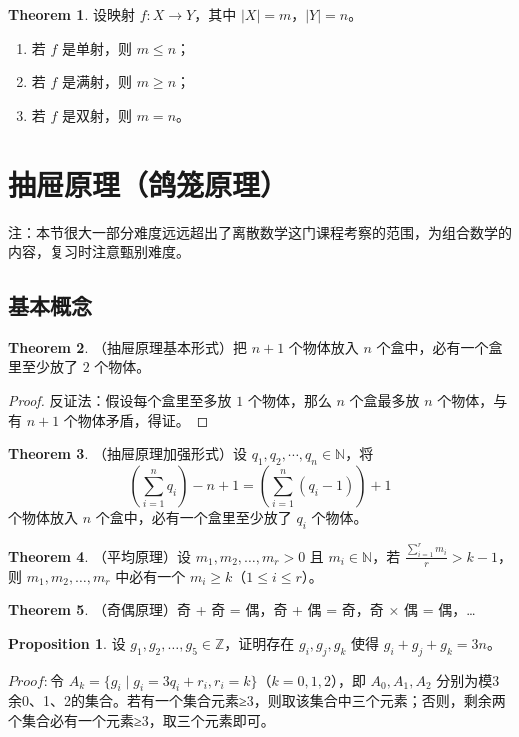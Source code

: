 \documentclass[oneside]{book}
\theoremstyle{definition}
\newtheorem{proposition}{Proposition}[section]
\newtheorem{theorem}{Theorem}[section]
\begin{document}
	
	\begin{theorem}
		设映射 \( f: X \to Y \)，其中 \( |X| = m \)，\( |Y| = n \)。
		\begin{enumerate}
			\item 若 \( f \) 是单射，则 \( m \leq n \)；
			\item 若 \( f \) 是满射，则 \( m \geq n \)；
			\item 若 \( f \) 是双射，则 \( m = n \)。
		\end{enumerate}
	\end{theorem}
	
	\section{抽屉原理（鸽笼原理）}
	注：本节很大一部分难度远远超出了离散数学这门课程考察的范围，为组合数学的内容，复习时注意甄别难度。
	\subsection{基本概念}
	\begin{theorem}
		（抽屉原理基本形式）把 \( n + 1 \) 个物体放入 \( n \) 个盒中，必有一个盒里至少放了 \( 2 \) 个物体。
		\begin{proof}
			反证法：假设每个盒里至多放 \( 1 \) 个物体，那么 \( n \) 个盒最多放 \( n \) 个物体，与有 \( n + 1 \) 个物体矛盾，得证。
		\end{proof}
	\end{theorem}
	
	\begin{theorem}
		（抽屉原理加强形式）设 \( q_1,q_2,\cdots,q_n \in \mathbb{N} \)，将 
		$$ \left( \sum_{i = 1}^n q_i \right) - n + 1 = \left( \sum_{i = 1}^n (q_i-1) \right)  + 1$$
		个物体放入 \( n \) 个盒中，必有一个盒里至少放了 \( q_i \) 个物体。
	\end{theorem}
	
	\begin{theorem}
		（平均原理）设 \( m_1, m_2, \dots, m_r > 0 \) 且 \( m_i \in \mathbb{N} \)，若 \( \frac{\sum_{i=1}^r m_i}{r} > k - 1 \)，则 \( m_1, m_2, \dots, m_r \) 中必有一个 \( m_i \geq k \)（\( 1 \leq i \leq r \)）。
	\end{theorem}
	
	\begin{theorem}
		（奇偶原理）奇 + 奇 = 偶，奇 + 偶 = 奇，奇 × 偶 = 偶，…
	\end{theorem}
	
	\begin{proposition}
		设 \( g_1, g_2, \dots, g_5 \in \mathbb{Z} \)，证明存在 \( g_i, g_j, g_k \) 使得 \( g_i + g_j + g_k = 3n \)。
		
		$Proof:$令 \( A_k = \{ g_i \mid g_i = 3q_i + r_i, r_i = k \} \)（\( k = 0, 1, 2 \)），即 \( A_0, A_1, A_2 \) 分别为模3余0、1、2的集合。若有一个集合元素≥3，则取该集合中三个元素；否则，剩余两个集合必有一个元素≥3，取三个元素即可。
	\end{proposition}
	
\end{document}
